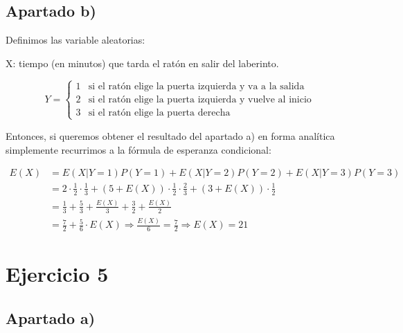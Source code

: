 \documentclass[11pt]{article}
\begin{document}
\subsection*{Apartado b)}

Definimos las variable aleatorias: \\
\begin{center}
  X: tiempo (en minutos) que tarda el ratón en salir del laberinto.
\end{center}

\[
  Y = \begin{cases}
        1 & \text{si el ratón elige la puerta izquierda y va a la salida} \\
        2 & \text{si el ratón elige la puerta izquierda y vuelve al inicio} \\
        3 & \text{si el ratón elige la puerta derecha}
      \end{cases}
\]

Entonces, si queremos obtener el resultado del apartado a) en forma analítica simplemente recurrimos
a la fórmula de esperanza condicional:

\begin{align*}
  E(X) &= E(X \vert Y = 1)P(Y = 1) + E(X \vert Y = 2)P(Y = 2) + E(X \vert Y = 3)P(Y = 3) \\
       &= 2 \cdot \frac{1}{2} \cdot \frac{1}{3} + 
          (5 + E(X)) \cdot \frac{1}{2} \cdot \frac{2}{3} +
          (3 + E(X)) \cdot \frac{1}{2} \\
      &= \frac{1}{3} + \frac{5}{3} + \frac{E(X)}{3} + \frac{3}{2} + \frac{E(X)}{2} \\
      &= \frac{7}{2} + \frac{5}{6} \cdot E(X) \Rightarrow \frac{E(X)}{6} = \frac{7}{2} \Rightarrow E(X) = 21
\end{align*}


\section{Ejercicio 5}

\subsection*{Apartado a)}
\end{document}
